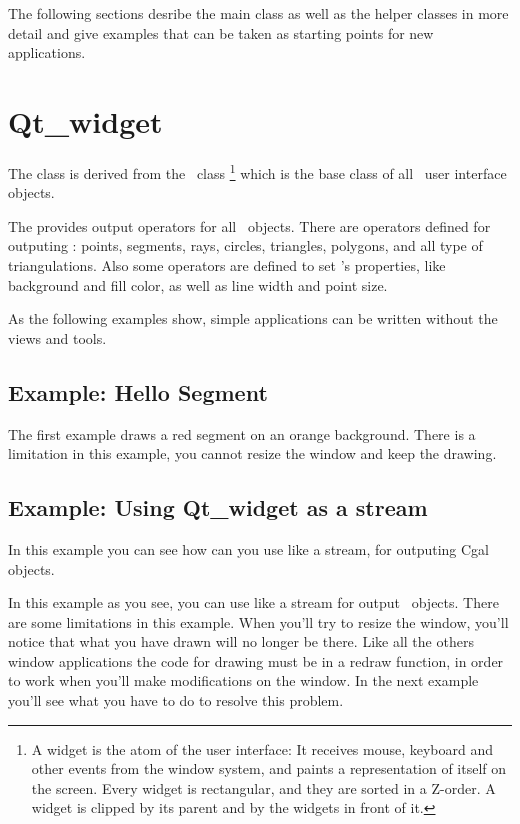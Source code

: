The following sections desribe the main class as well as the helper classes
in more detail and give examples that can be taken as starting points for
new applications.


\section{Qt\_widget}
\label{Qt_widget}

The class  is derived from the \qt\ class %
\footnote{A widget is the atom of the user interface: It receives mouse, keyboard and other 
events from the window system, and paints a representation of itself on the 
screen. Every widget is rectangular, and they are sorted in a Z-order. A 
widget is clipped by its parent and by the widgets in front of it.} 
which is the base class of all \qt\ user interface objects. 


The  provides output operators for all \cgal\ objects. There are 
operators defined for outputing : points, segments, rays, circles, triangles, 
polygons, and all type of triangulations. Also some operators are defined to 
set 's properties, like background and fill color, as well as line
width and point size.

As the following examples show, simple applications can be written
without the views and tools.

\subsection{Example: Hello Segment}
The first example draws a red segment on an orange background.
There is a limitation in this example, you cannot resize the window and keep the drawing.

\subsection{Example: Using Qt\_widget as a stream}

In this example you can see how can you use  like a stream, for outputing Cgal objects.


In this example as you see, you can use  like a stream for output \cgal\ objects.
 There are some limitations in this example. When you'll try to resize the window, you'll notice that what you have drawn will no longer be there. Like all
the others window applications the code for drawing must be in a redraw function, in order
to work when you'll make modifications on the window. In the next example you'll see what
you have to do to resolve this problem.

